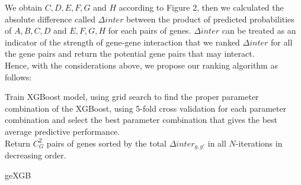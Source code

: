\documentclass[11pt]{article}
\theoremstyle{plain}
\theoremstyle{definition}
\theoremstyle{remark}
\begin{document}
\noindent We obtain $C, D, E, F, G$ and $H$ according to Figure 2, then we calculated the absolute difference called $\Delta inter$ between the product of predicted probabilities of $A,B,C,D$ and $E,F,G,H$ for each pairs of genes. $\Delta inter$ can be treated as an indicator of the strength of gene-gene interaction that we ranked $\Delta inter$ for all the gene pairs and return the potential gene pairs that may interact.\\

\noindent Hence, with the considerations above, we propose our ranking algorithm as follows:

\begin{algorithm}[H]
\SetAlgoLined
{}
Train XGBoost model, using grid search to find the proper parameter combination of the XGBoost, using 5-fold cross validation for each parameter combination and select the best parameter combination that gives the best average predictive performance.\\
Return $C^2_G$ pairs of genes sorted by the total $\Delta inter_{g,g'}$ in all $N$-iterations in decreasing order.
 \caption{geXGB}
\end{algorithm}
\end{document}
